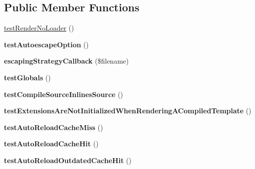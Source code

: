 \subsection*{Public Member Functions}
\begin{DoxyCompactItemize}
\item 
\hyperlink{classTwig__Tests__EnvironmentTest_a2e69267451a050e5a5d1079bf62ecc4a}{test\+Render\+No\+Loader} ()
\item 
{\bfseries test\+Autoescape\+Option} ()\hypertarget{classTwig__Tests__EnvironmentTest_adf42d8ad8b468946442a3bcadf0944ac}{}\label{classTwig__Tests__EnvironmentTest_adf42d8ad8b468946442a3bcadf0944ac}

\item 
{\bfseries escaping\+Strategy\+Callback} (\$filename)\hypertarget{classTwig__Tests__EnvironmentTest_ac987a4c470a95e3337c02c09e5b0abfd}{}\label{classTwig__Tests__EnvironmentTest_ac987a4c470a95e3337c02c09e5b0abfd}

\item 
{\bfseries test\+Globals} ()\hypertarget{classTwig__Tests__EnvironmentTest_a50131d12d2168cfa9b28bb19e36c2ae2}{}\label{classTwig__Tests__EnvironmentTest_a50131d12d2168cfa9b28bb19e36c2ae2}

\item 
{\bfseries test\+Compile\+Source\+Inlines\+Source} ()\hypertarget{classTwig__Tests__EnvironmentTest_a709e3f2cb25505c5204ffe157208d7ff}{}\label{classTwig__Tests__EnvironmentTest_a709e3f2cb25505c5204ffe157208d7ff}

\item 
{\bfseries test\+Extensions\+Are\+Not\+Initialized\+When\+Rendering\+A\+Compiled\+Template} ()\hypertarget{classTwig__Tests__EnvironmentTest_af7bb4bdd4a1236639367908552d94f60}{}\label{classTwig__Tests__EnvironmentTest_af7bb4bdd4a1236639367908552d94f60}

\item 
{\bfseries test\+Auto\+Reload\+Cache\+Miss} ()\hypertarget{classTwig__Tests__EnvironmentTest_ab1f18a73424bf2803cc3c121cd227fde}{}\label{classTwig__Tests__EnvironmentTest_ab1f18a73424bf2803cc3c121cd227fde}

\item 
{\bfseries test\+Auto\+Reload\+Cache\+Hit} ()\hypertarget{classTwig__Tests__EnvironmentTest_a708fb31869c93280a86aab16f401a038}{}\label{classTwig__Tests__EnvironmentTest_a708fb31869c93280a86aab16f401a038}

\item 
{\bfseries test\+Auto\+Reload\+Outdated\+Cache\+Hit} ()\hypertarget{classTwig__Tests__EnvironmentTest_a4c34c6ef5134914056e1ec4bcf3f473b}{}\label{classTwig__Tests__EnvironmentTest_a4c34c6ef5134914056e1ec4bcf3f473b}


\end{DoxyCompactItemize}
